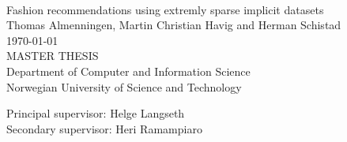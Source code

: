 \documentclass[10pt,a4paper,oneside]{report}
\def \thesistitle{Fashion recommendations using extremly sparse implicit datasets}
\def \authorname{Thomas Almenningen, Martin Christian Havig and Herman Schistad}
\def \supheri{Heri Ramampiaro}
\def \suphelge{Helge Langseth}
\begin{document}

\newcommand{\thesistitlepage}[0]{
  \begin{titlepage}
  \begin{center}
  \mbox{}\\[6pc]
  \begin{center}
  \Huge{\thesistitle}\\[2pc]

  \Large{\authorname}\\[1pc]
  \large{\today}\\[2pc]

  MASTER THESIS\\
  Department of Computer and Information Science\\
  Norwegian University of Science and Technology
  \end{center}
  \vfill

  \noindent Principal supervisor: \suphelge \\
  \noindent Secondary supervisor: \supheri

  \end{center}
  \end{titlepage}
  \clearpage
}

\thesistitlepage

\end{document}
